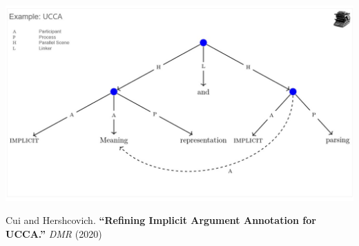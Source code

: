 \documentclass[t,xcolor={svgnames,table}]{beamer}
\begin{document}
\begin{frame}
\includegraphics[width=\textwidth]{ucca_meaning_implicit}

Cui and Hershcovich. \textbf{``Refining Implicit Argument Annotation for UCCA.''} \textit{DMR} (2020)
\end{frame}
\end{document}
